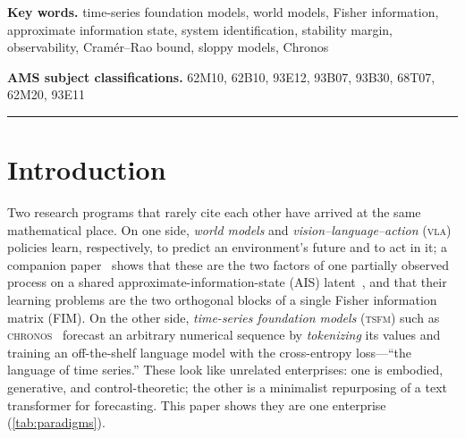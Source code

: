 \documentclass[10pt]{article}
\theoremstyle{plain}
\theoremstyle{definition}
\theoremstyle{remark}
\newcommand{\Fisher}{\mathcal{I}}
\newcommand{\Ith}{\Fisher_{\theta\theta}}
\newcommand{\TSFM}{\textsc{tsfm}}
\newcommand{\WAM}{\textsc{wam}}
\newcommand{\VLA}{\textsc{vla}}
\newcommand{\Chronos}{\textsc{chronos}}
\begin{document}
\begin{abstract}
by longer series) and the \emph{unobserved} modes (sensor-limited, curable only
by a new observation channel), so the \WAM/\VLA\ data-versus-sensor dichotomy
becomes a statement about which time series a foundation model can and cannot
learn to forecast. A large numerical study on a stable LQG system with $200$
latent states and $100$ observations confirms every claim: the measured FIM has
exactly as many null directions as unobserved modes, its per-mode information
tracks $1/(1-r^2)$ to a log--log correlation of $0.97$, $\lambda_{\max}$ scales
as $1/(1-\rho)$, and a trained \Chronos-lite model's forecast skill rises with
stability and tracks $\log\det\Ith$, while sloppy directions are learned last in
exact proportion to their Fisher eigenvalue. The common theme: world modeling,
instruction-conditioned control, and time-series forecasting are three channels
of one process measured by one Fisher matrix whose spectrum is written by
dynamics.
\end{abstract}

\begin{center}\small
\textbf{Key words.} time-series foundation models, world models, Fisher
information, approximate information state, system identification, stability
margin, observability, Cram\'er--Rao bound, sloppy models, Chronos
\end{center}
\begin{center}\small
\textbf{AMS subject classifications.}
62M10, 62B10, 93E12, 93B07, 93B30, 68T07, 62M20, 93E11
\end{center}
\bigskip\hrule\bigskip

\section{Introduction}
\label{sec:intro}

Two research programs that rarely cite each other have arrived at the same
mathematical place. On one side, \emph{world models} and
\emph{vision--language--action} (\VLA) policies learn, respectively, to predict
an environment's future and to act in it; a companion paper~\cite{wamvla} shows
that these are the two factors of one partially observed process on a shared
approximate-information-state (AIS) latent~\cite{ais2022}, and that their
learning problems are the two orthogonal blocks of a single Fisher information
matrix (FIM). On the other side, \emph{time-series foundation models} (\TSFM)
such as \Chronos~\cite{chronos} forecast an arbitrary numerical sequence by
\emph{tokenizing} its values and training an off-the-shelf language model with
the cross-entropy loss---``the language of time series.'' These look like
unrelated enterprises: one is embodied, generative, and control-theoretic; the
other is a minimalist repurposing of a text transformer for forecasting. This
paper shows they are one enterprise (\cref{tab:paradigms}).
\end{document}
